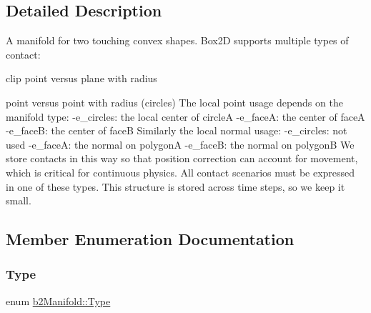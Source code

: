 \subsection{Detailed Description}
A manifold for two touching convex shapes. Box2D supports multiple types of contact\+:
\begin{DoxyItemize}
\item clip point versus plane with radius
\item point versus point with radius (circles) The local point usage depends on the manifold type\+: -\/e\+\_\+circles\+: the local center of circleA -\/e\+\_\+faceA\+: the center of faceA -\/e\+\_\+faceB\+: the center of faceB Similarly the local normal usage\+: -\/e\+\_\+circles\+: not used -\/e\+\_\+faceA\+: the normal on polygonA -\/e\+\_\+faceB\+: the normal on polygonB We store contacts in this way so that position correction can account for movement, which is critical for continuous physics. All contact scenarios must be expressed in one of these types. This structure is stored across time steps, so we keep it small. 
\end{DoxyItemize}

\subsection{Member Enumeration Documentation}
\mbox{\label{structb2_manifold_aa9c347e2ff2e27ee820a926efbb33e12}} 
\subsubsection{\texorpdfstring{Type}{Type}}
{\footnotesize\ttfamily enum \mbox{\hyperlink{structb2_manifold_aa9c347e2ff2e27ee820a926efbb33e12}{b2\+Manifold\+::\+Type}}}

